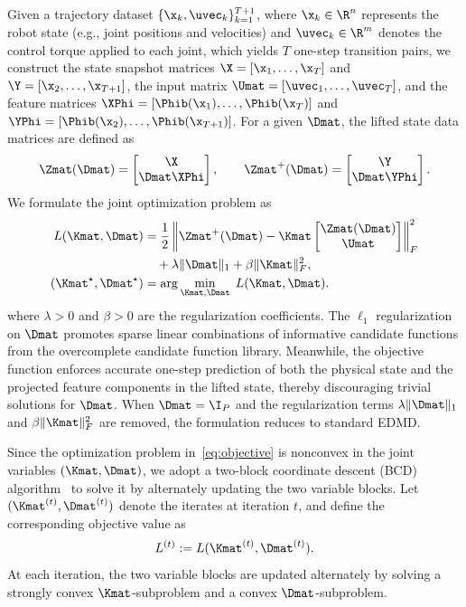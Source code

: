 Given a trajectory dataset $\{\x_k, \uvec_k\}_{k=1}^{T+1}$, where $\x_k \in \R^n$ represents the robot state (e.g., joint positions and velocities) and $\uvec_k \in \R^m$ denotes the control torque applied to each joint, which yields $T$ one-step transition pairs, we construct the state snapshot matrices $\X = [\x_1, \dots, \x_T]$ and $\Y = [\x_2, \dots, \x_{T+1}]$, the input matrix $\Umat = [\uvec_1, \dots, \uvec_T]$, and the feature matrices $\XPhi = [\Phib(\x_1), \dots, \Phib(\x_T)]$ and $\YPhi = [\Phib(\x_2), \dots, \Phib(\x_{T+1})]$. For a given $\Dmat$, the lifted state data matrices are defined as
\begin{equation}
\Zmat(\Dmat) =
\begin{bmatrix}
\X \\ \Dmat \XPhi
\end{bmatrix}, \qquad
\Zmat^+(\Dmat) =
\begin{bmatrix}
\Y \\ \Dmat \YPhi
\end{bmatrix}.
\end{equation}
We formulate the joint optimization problem as
\begin{equation}
\label{eq:objective}
\begin{aligned}
L(\Kmat,\Dmat) &= \frac{1}{2}
\left\|
\Zmat^+(\Dmat) - \Kmat
\begin{bmatrix}
\Zmat(\Dmat) \\ \Umat
\end{bmatrix}
\right\|_F^2 \\
&\quad + \lambda\|\Dmat\|_1 + \beta\|\Kmat\|_F^2, \\
(\Kmat^\star, \Dmat^\star) &= \arg\min_{\Kmat,\Dmat} \; L(\Kmat,\Dmat).
\end{aligned}
\end{equation}
where $\lambda>0$ and $\beta>0$ are the regularization coefficients. The $\ell_1$ regularization on $\Dmat$ promotes sparse linear combinations of informative candidate functions from the overcomplete candidate function library. Meanwhile, the objective function enforces accurate one-step prediction of both the physical state and the projected feature components in the lifted state, thereby discouraging trivial solutions for $\Dmat$. When $\Dmat = \I_P$ and the regularization terms $\lambda\|\Dmat\|_1$ and $\beta\|\Kmat\|_F^2$ are removed, the formulation reduces to standard EDMD.

Since the optimization problem in~\eqref{eq:objective} is nonconvex in
the joint variables $(\Kmat,\Dmat)$, we adopt a two-block coordinate
descent (BCD) algorithm~\cite{Tseng2001} to solve it by alternately
updating the two variable blocks. Let $(\Kmat^{(t)},\Dmat^{(t)})$
denote the iterates at iteration $t$, and define the corresponding objective value as
\[
L^{(t)} := L(\Kmat^{(t)},\Dmat^{(t)}).
\]
At each iteration, the two variable blocks are updated alternately by solving a strongly convex $\Kmat$-subproblem and a convex $\Dmat$-subproblem.

